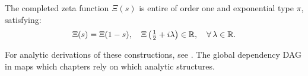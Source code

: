 \noindent
The completed zeta function \( \Xi(s) \) is entire of order one and exponential type \( \pi \), satisfying:
\[
\Xi(s) = \Xi(1 - s), \quad \Xi\left( \tfrac{1}{2} + i\lambda \right) \in \mathbb{R}, \quad \forall\, \lambda \in \mathbb{R}.
\]

\medskip

\noindent
For analytic derivations of these constructions, see . The global dependency DAG in  maps which chapters rely on which analytic structures.
